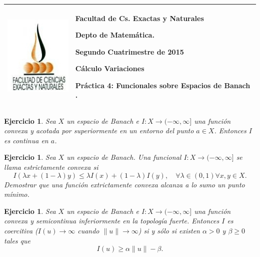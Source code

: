 \documentclass{article}
\newcounter{ejer}
\newtheorem{ejercicio}[ejer]{Ejercicio}}
\begin{document}
\setlength{\unitlength}{1cm}
%
\setlength{\extrarowheight}{5mm}
%

\setlength{\extrarowheight}{-5mm}
\noindent\begin{tabular}{m{} m{}}\hline\hline
\medskip
\includegraphics[scale=.4]{imagenes/ico_exactas.jpg} &
\begin{bfseries}  \begin{scshape}
Facultad de Cs. Exactas y Naturales\par
        Depto de Matemática.\par
        Segundo Cuatrimestre de 2015\par
        Cálculo Variaciones \par
        Práctica 4: Funcionales sobre Espacios de Banach .
				\end{scshape}
\end{bfseries}
\\
\hline\hline
\end{tabular}
\renewcommand{\theenumi}{\alph{enumi}}


\begin{ejercicio} Sea $X$ un espacio de Banach
e $I:X\to (-\infty,\infty]$ una función convexa y acotada por superiormente  en
un entorno del punto $a\in X$.  Entonces  $I$ es continua en $a$.
\end{ejercicio}
\begin{ejercicio} Sea $X$ un espacio de Banach. Una funcional $I:X\to (-\infty,\infty]$ se llama \emph{estrictamente convexa} si
\[I(\lambda x+(1-\lambda)y)\leq \lambda I(x)+(1-\lambda)I(y),\quad\forall\lambda\in(0,1)\forall x,y\in X.\]
Demostrar que una función extrictamente convexa alcanza a lo sumo un punto mínimo.

\end{ejercicio}

\begin{ejercicio}
Sea $X$ un espacio de Banach
e $I:X\to (-\infty,\infty]$ una función convexa  y semicontinua inferiormente en la topología fuerte. Entonces $I$ es coercitiva ($I(u)\to\infty$ cuando $\|u\|\to\infty$) si y sólo si existen $\alpha>0$ y $\beta\geq 0$ tales que
\[I(u)\geq \alpha \|u\|-\beta.\]
\end{ejercicio}
\end{document}
